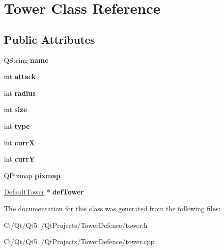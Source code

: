 \hypertarget{class_tower}{}\section{Tower Class Reference}
\label{class_tower}
\subsection*{Public Attributes}
\begin{DoxyCompactItemize}
\item 
\hypertarget{class_tower_a803c6579e436e1e31895652c862cea50}{}Q\+String {\bfseries name}\label{class_tower_a803c6579e436e1e31895652c862cea50}

\item 
\hypertarget{class_tower_a4199f2c62e185258b04b14d26612b94f}{}int {\bfseries attack}\label{class_tower_a4199f2c62e185258b04b14d26612b94f}

\item 
\hypertarget{class_tower_aefe51653cbf64e11e8794fd50b27ca4a}{}int {\bfseries radius}\label{class_tower_aefe51653cbf64e11e8794fd50b27ca4a}

\item 
\hypertarget{class_tower_ae31d42c6aca51c416f5c7ca5018b1e74}{}int {\bfseries size}\label{class_tower_ae31d42c6aca51c416f5c7ca5018b1e74}

\item 
\hypertarget{class_tower_a9fea2a9224a275cda965a2a8d590e015}{}int {\bfseries type}\label{class_tower_a9fea2a9224a275cda965a2a8d590e015}

\item 
\hypertarget{class_tower_a675eb6e07e3077a09f757dcec94cf301}{}int {\bfseries curr\+X}\label{class_tower_a675eb6e07e3077a09f757dcec94cf301}

\item 
\hypertarget{class_tower_ab349e9dbad3317d8150ba7ab76534b5a}{}int {\bfseries curr\+Y}\label{class_tower_ab349e9dbad3317d8150ba7ab76534b5a}

\item 
\hypertarget{class_tower_a35616729eee64fd2010ef3ef4c10e251}{}Q\+Pixmap {\bfseries pixmap}\label{class_tower_a35616729eee64fd2010ef3ef4c10e251}

\item 
\hypertarget{class_tower_ac1cfd4c3ddf72f1a9dccbf4f7eeebc73}{}\hyperlink{class_default_tower}{Default\+Tower} $\ast$ {\bfseries def\+Tower}\label{class_tower_ac1cfd4c3ddf72f1a9dccbf4f7eeebc73}

\end{DoxyCompactItemize}


The documentation for this class was generated from the following files\+:\begin{DoxyCompactItemize}
\item 
C\+:/\+Qt/\+Qt5../\+Qt\+Projects/\+Tower\+Defence/tower.\+h\item 
C\+:/\+Qt/\+Qt5../\+Qt\+Projects/\+Tower\+Defence/tower.\+cpp\end{DoxyCompactItemize}
